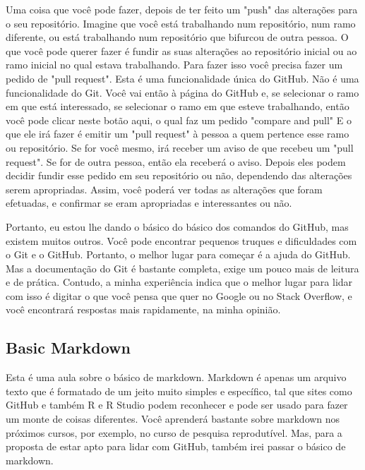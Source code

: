 Uma coisa que você pode fazer,  depois de ter feito um "push" das alterações para o seu repositório. Imagine que você está trabalhando num repositório, num ramo diferente, ou está trabalhando num repositório que bifurcou de outra pessoa. O que você pode querer fazer é fundir as suas alterações ao repositório inicial ou ao ramo inicial no qual estava trabalhando. Para fazer isso você precisa fazer um pedido de "pull request". Esta é uma funcionalidade única do GitHub. Não é uma funcionalidade do Git. Você vai então à página do GitHub e, se selecionar o ramo em que está interessado, se selecionar o ramo em que esteve trabalhando, então você pode clicar neste botão aqui, o qual faz um pedido "compare and pull" E o que ele irá fazer é emitir um "pull request" à pessoa a quem pertence esse ramo ou repositório. Se for você mesmo, irá receber um aviso de que recebeu um "pull request". Se for de outra pessoa, então ela receberá o aviso. Depois eles podem decidir fundir esse pedido em seu repositório ou não, dependendo das alterações serem apropriadas. Assim, você poderá ver todas as alterações que foram efetuadas, e confirmar se eram apropriadas e interessantes ou não. 

Portanto, eu estou lhe dando o básico do básico dos comandos do GitHub, mas existem muitos outros. Você pode encontrar pequenos truques e dificuldades com o Git e o GitHub. Portanto, o melhor lugar para começar é a ajuda do GitHub. Mas a documentação do Git é bastante completa, exige um pouco mais de leitura e de prática. Contudo, a minha experiência indica que o melhor lugar para lidar com isso é digitar o que você pensa que quer no Google ou no Stack Overflow, e você encontrará respostas mais rapidamente, na minha opinião. 


\subsection{Basic Markdown}

Esta é uma aula sobre o básico de markdown. Markdown é apenas um arquivo texto que é formatado de um jeito muito simples e específico, tal que sites como GitHub e também R e R Studio podem reconhecer e pode ser usado para fazer um monte de coisas diferentes. Você aprenderá bastante sobre markdown nos próximos cursos, por exemplo, no curso de pesquisa reprodutível. Mas, para a proposta de estar apto para lidar com GitHub, também irei passar o básico de markdown. 

